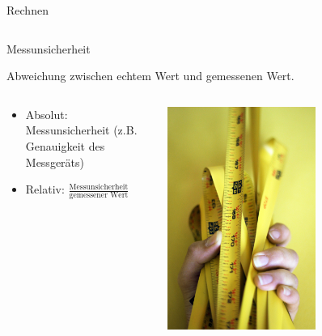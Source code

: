 \documentclass{beamer}
\begin{document}
\begin{frame}{Rechnen}
\begin{columns}[c]
\begin{column}{5cm}

\end{column}

\end{columns}

\end{frame}



\begin{frame}{Messunsicherheit}

Abweichung zwischen echtem Wert und gemessenen Wert. \\

\begin{columns}[c]

\begin{column}{5cm}
\begin{itemize}
    \item 
Absolut: Messunsicherheit (z.B. Genauigkeit des Messgeräts)
\item
Relativ: $\frac{\text{Messunsicherheit}}{\text{gemessener Wert}}$
\end{itemize}

\end{column}

\begin{column}{5cm}
\begin{center}
    \includegraphics[width=0.6\textwidth]{massband.jpg}
\end{center}
\end{column}
\end{columns}


\end{frame}
\end{document}
